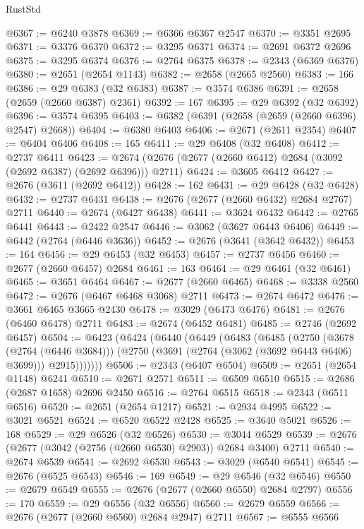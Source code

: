 \begin{lexlean}{RustStd}
\begin{coremodule}
{\begin{coremodule}
{{{{{{{{{{{{{{{{{{{{{{{{{{{{{{{{{{{{{{{{{{{{{{{{{{{{{{{@6367 := @6240 @3878
@6369 := @6366 @6367 @2547
@6370 := @3351 @2695
@6371 := @3376 @6370
@6372 := @3295 @6371
@6374 := @2691 @6372 @2696
@6375 := @3295 @6374
@6376 := @2764 @6375
@6378 := @2343 (@6369 @6376)
@6380 := @2651 (@2654 @1143)
@6382 := @2658 (@2665 @2560)
@6383 := 166
@6386 := @29 @6383 (@32 @6383)
@6387 := @3574 @6386
@6391 := @2658 (@2659 (@2660 @6387) @2361)
@6392 := 167
@6395 := @29 @6392 (@32 @6392)
@6396 := @3574 @6395
@6403 := @6382 (@6391 (@2658 (@2659 (@2660 @6396) @2547) @2668))
@6404 := @6380 @6403
@6406 := @2671 (@2611 @2354)
@6407 := @6404 @6406
@6408 := 165
@6411 := @29 @6408 (@32 @6408)
@6412 := @2737 @6411
@6423 := @2674 (@2676 (@2677 (@2660 @6412) @2684 (@3092 (@2692 @6387) (@2692 @6396))) @2711)
@6424 := @3605 @6412
@6427 := @2676 (@3611 (@2692 @6412))
@6428 := 162
@6431 := @29 @6428 (@32 @6428)
@6432 := @2737 @6431
@6438 := @2676 (@2677 (@2660 @6432) @2684 @2767) @2711
@6440 := @2674 (@6427 @6438)
@6441 := @3624 @6432
@6442 := @2765 @6441
@6443 := @2422 @2547
@6446 := @3062 (@3627 @6443 @6406)
@6449 := @6442 (@2764 (@6446 @3636))
@6452 := @2676 (@3641 (@3642 @6432))
@6453 := 164
@6456 := @29 @6453 (@32 @6453)
@6457 := @2737 @6456
@6460 := @2677 (@2660 @6457) @2684
@6461 := 163
@6464 := @29 @6461 (@32 @6461)
@6465 := @3651 @6464
@6467 := @2677 (@2660 @6465)
@6468 := @3338 @2560
@6472 := @2676 (@6467 @6468 @3068) @2711
@6473 := @2674 @6472
@6476 := @3661 @6465 @3665 @2430
@6478 := @3029 (@6473 @6476)
@6481 := @2676 (@6460 @6478) @2711
@6483 := @2674 (@6452 @6481)
@6485 := @2746 (@2692 @6457)
@6504 := @6423
    (@6424
      (@6440
        (@6449
          (@6483
            (@6485
              (@2750
                (@3678 (@2764 (@6446 @3684)))
                (@2750 (@3691 (@2764 (@3062 (@3692 @6443 @6406) @3699))) @2915)))))))
@6506 := @2343 (@6407 @6504)
@6509 := @2651 (@2654 @1148) @6241
@6510 := @2671 @2571
@6511 := @6509 @6510
@6515 := @2686 (@2687 @1658) @2696 @2450
@6516 := @2764 @6515
@6518 := @2343 (@6511 @6516)
@6520 := @2651 (@2654 @1217)
@6521 := @2934 @4995
@6522 := @3021 @6521
@6524 := @6520 @6522 @2428
@6525 := @3640 @5021
@6526 := 168
@6529 := @29 @6526 (@32 @6526)
@6530 := @3044 @6529
@6539 := @2676 (@2677 (@3042 (@2756 (@2660 @6530) @2903)) @2684 @3400) @2711
@6540 := @2674 @6539
@6541 := @2692 @6530
@6543 := @3029 (@6540 @6541)
@6545 := @2676 (@6525 @6543)
@6546 := 169
@6549 := @29 @6546 (@32 @6546)
@6550 := @2679 @6549
@6555 := @2676 (@2677 (@2660 @6550) @2684 @2797)
@6556 := 170
@6559 := @29 @6556 (@32 @6556)
@6560 := @2679 @6559
@6566 := @2676 (@2677 (@2660 @6560) @2684 @2947) @2711
@6567 := @6555 @6566
}}}}}}}}}}}}}}}}}}}}}}}}}}}}}}}}}}}}}}}}}}}}}}}}}}}}}}}
\end{coremodule}}
\end{coremodule}
\end{lexlean}
